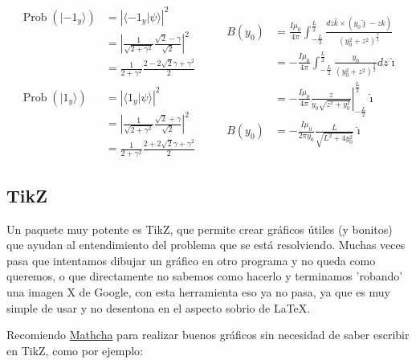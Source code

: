 \documentclass[11pt,letterpaper]{article}
\DeclareMathOperator{\probabi}{Prob}               %
\newcommand{\prob}[1]{\probabi\left( #1 \right)}   %
\newcommand{\abs}[1]{\left|#1\right|}              %
\newcommand{\ket}[1]{| #1 \rangle}                 %
\newcommand{\braket}[2]{\langle #1 | #2 \rangle}   %
\newcommand{\eval}[3]{\left.#1\right|_{#2}^{#3}}   %
\begin{document}
\begin{equation*}
    \begin{split}
        \prob{\ket{-1_y}} &= \abs{\braket{-1_y}{\psi}}^2\\
        &= \abs{\frac{1}{\sqrt{2+\gamma^2}}\frac{\sqrt{2} - \gamma}{\sqrt{2}}}^2\\
        &= \frac{1}{2+\gamma^2}\frac{2-2\sqrt{2}\gamma + \gamma^2}{2}\\
         \\
        \prob{\ket{1_y}} &= \abs{\braket{1_y}{\psi}}^2\\
        &= \abs{\frac{1}{\sqrt{2+\gamma^2}}\frac{\sqrt{2} + \gamma}{\sqrt{2}}}^2\\
        &= \frac{1}{2+\gamma^2}\frac{2+2\sqrt{2}\gamma + \gamma^2}{2}
    \end{split}
    \qquad
    \begin{split}
        B(y_0) &= \frac{I\mu_0}{4\pi}\int_{-\frac{L}{2}}^{\frac{L}{2}} \frac{dz\hat{k}\times(y_0\hat{\jmath} - z\hat{k})}{(y_0^2 + z^2)^{\frac{3}{2}}}\\
        &= -\frac{I\mu_0}{4\pi}\int_{-\frac{L}{2}}^{\frac{L}{2}} \frac{y_0}{(y_0^2 + z^2)^{\frac{3}{2}}}dz\hat{\imath}\\
        &= -\frac{I\mu_0}{4\pi}\eval{\frac{z}{y_0\sqrt{z^2+y_0^2}}}{-\frac{L}{2}}{\frac{L}{2}}\hat{\imath}\\
        B(y_0) &= -\frac{I\mu_0}{2\pi y_0}\frac{L}{\sqrt{L^2 + 4y_0^2}}\hat{\imath}
    \end{split}
\end{equation*}

\subsection*{TikZ}
Un paquete muy potente es TikZ, que permite crear gráficos útiles (y bonitos) que ayudan al entendimiento del problema que se está resolviendo. Muchas veces pasa que intentamos dibujar un gráfico en otro programa y no queda como queremos, o que directamente no sabemos como hacerlo y terminamos 'robando' una imagen X de Google, con esta herramienta eso ya no pasa, ya que es muy simple de usar y no desentona en el aspecto sobrio de \LaTeX.\par
Recomiendo \href{https://www.mathcha.io/}{Mathcha} para realizar buenos gráficos sin necesidad de saber escribir en TikZ, como por ejemplo:
\end{document}
